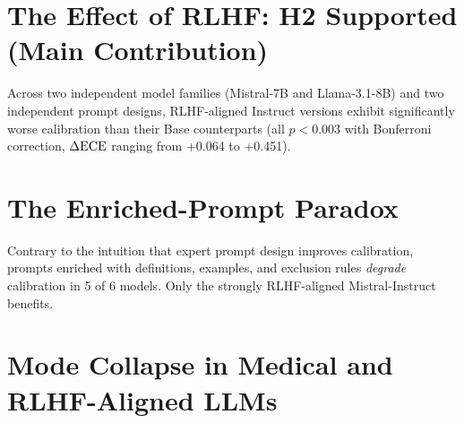 \section{The Effect of RLHF: H2 Supported (Main Contribution)}
\label{sec:res-h2}


\begin{finding}
    Across two independent model families (Mistral-7B and Llama-3.1-8B) and
    two independent prompt designs, RLHF-aligned Instruct versions exhibit
    significantly worse calibration than their Base counterparts
    (all $p < 0.003$ with Bonferroni correction, $\Delta\textrm{ECE}$ ranging from
    +0.064 to +0.451).
\end{finding}


\section{The Enriched-Prompt Paradox}
\label{sec:res-prompt}


\begin{finding}
    Contrary to the intuition that expert prompt design improves calibration,
    prompts enriched with definitions, examples, and exclusion rules
    \emph{degrade} calibration in 5 of 6 models. Only the strongly
    RLHF-aligned Mistral-Instruct benefits.
\end{finding}

\section{Mode Collapse in Medical and RLHF-Aligned LLMs}
\label{sec:res-mode-collapse}

